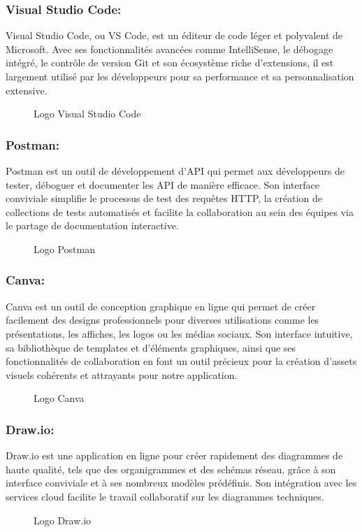 \subsubsection*{Visual Studio Code:}
Visual Studio Code, ou VS Code, \cite{b19}est un éditeur de code léger et polyvalent de Microsoft. Avec ses fonctionnalités avancées comme IntelliSense, le débogage intégré, le contrôle de version Git et son écosystème riche d'extensions, il est largement utilisé par les développeurs pour sa performance et sa personnalisation extensive.
\begin{figure}[H]
\centering
{}
\caption{Logo Visual Studio Code}
\end{figure}

\subsubsection*{Postman:}
Postman \cite{b20}est un outil de développement d'API qui permet aux développeurs de tester, déboguer et documenter les API de manière efficace. Son interface conviviale simplifie le processus de test des requêtes HTTP, la création de collections de tests automatisés et facilite la collaboration au sein des équipes via le partage de documentation interactive.
\begin{figure}[H]
\centering
{}
\caption{Logo Postman}
\end{figure}

\subsubsection*{Canva:}
Canva \cite{b21}est un outil de conception graphique en ligne qui permet de créer facilement des designs professionnels pour diverses utilisations comme les présentations, les affiches, les logos ou les médias sociaux. Son interface intuitive, sa bibliothèque de templates et d'éléments graphiques, ainsi que ses fonctionnalités de collaboration en font un outil précieux pour la création d'assets visuels cohérents et attrayants pour notre application.
\begin{figure}[H]
\centering
{}
\caption{Logo Canva}
\end{figure}

\subsubsection*{Draw.io:}
Draw.io \cite{b22}est une application en ligne pour créer rapidement des diagrammes de haute qualité, tels que des organigrammes et des schémas réseau, grâce à son interface conviviale et à ses nombreux modèles prédéfinis. Son intégration avec les services cloud facilite le travail collaboratif sur les diagrammes techniques.
\begin{figure}[H]
\centering
{}
\caption{Logo Draw.io}
\end{figure}

